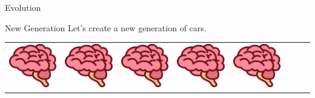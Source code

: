 \documentclass{beamer}
\begin{document}
\begin{frame}{Evolution}
    \begin{block}{New Generation}
        \small{Let’s create a new generation of cars.}
        \hfill
        \begin{tabular}{c|c|c|c|c|c|c|c}
            \includegraphics[scale=0.66]{brain0.png}&
            \includegraphics[scale=0.66]{brain0.png}&
            \includegraphics[scale=0.66]{brain0.png}&
            \includegraphics[scale=0.66]{brain0.png}&
            \includegraphics[scale=0.66]{brain0.png}&

\end{tabular}
\end{block}
\end{frame}
\end{document}
